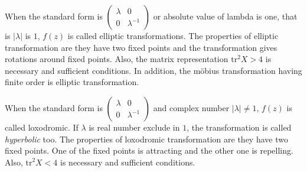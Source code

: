 When the standard form is
$\begin{pmatrix}\lambda & 0 \\ 0 & \lambda^{-1} \end{pmatrix}$
or absolute value of lambda is one, that is  $|\lambda|$ is $1$, 
$f(z)$ is called elliptic transformations.
The properties of elliptic transformation are they have
two fixed points and the transformation gives rotations around fixed
points.
Also, the matrix representation $\mathrm{tr}^2X > 4$ is 
necessary and sufficient conditions.
In addition, the m\"obius transformation having finite order
is elliptic transformation.

When the standard form is
$\begin{pmatrix}\lambda & 0 \\ 0 & \lambda^{-1} \end{pmatrix}$
and complex number $|\lambda| \neq 1$, $f(z)$ is called loxodromic.
If $\lambda$ is real number exclude in $1$, the transformation is called
\textit{hyperbolic} too.
The properties of loxodromic transformation are they have two fixed
points. One of the fixed points is attracting and the other one is repelling.
Also, $\mathrm{tr}^2X < 4$ is necessary and sufficient conditions.

